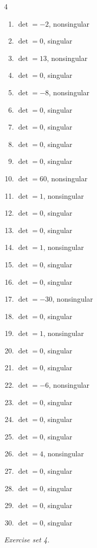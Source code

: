 \begin{multicols}{4}\raggedright
\begin{enumerate}[label=\arabic*., leftmargin=*, itemsep=1pt]
\item $\det=-2$, nonsingular
\item $\det=0$, singular
\item $\det=13$, nonsingular
\item $\det=0$, singular
\item $\det=-8$, nonsingular
\item $\det=0$, singular
\item $\det=0$, singular
\item $\det=0$, singular
\item $\det=0$, singular
\item $\det=60$, nonsingular
\item $\det=1$, nonsingular
\item $\det=0$, singular
\item $\det=0$, singular
\item $\det=1$, nonsingular
\item $\det=0$, singular
\item $\det=0$, singular
\item $\det=-30$, nonsingular
\item $\det=0$, singular
\item $\det=1$, nonsingular
\item $\det=0$, singular
\item $\det=0$, singular
\item $\det=-6$, nonsingular
\item $\det=0$, singular
\item $\det=0$, singular
\item $\det=0$, singular
\item $\det=4$, nonsingular
\item $\det=0$, singular
\item $\det=0$, singular
\item $\det=0$, singular
\item $\det=0$, singular
\end{enumerate}
\end{multicols}
\par\noindent\emph{Exercise set 4.}\nopagebreak
